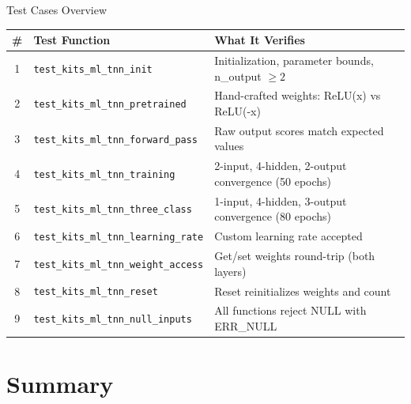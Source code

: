 \documentclass[aspectratio=169, 10pt]{beamer}
\begin{document}
\begin{frame}{Test Cases Overview}
\begin{table}
\centering
\small
\begin{tabular}{@{}clp{7cm}@{}}
\toprule
\textbf{\#} & \textbf{Test Function} & \textbf{What It Verifies} \\
\midrule
1 & \texttt{test\_kits\_ml\_tnn\_init}
  & Initialization, parameter bounds, n\_output $\geq 2$ \\
2 & \texttt{test\_kits\_ml\_tnn\_pretrained}
  & Hand-crafted weights: ReLU(x) vs ReLU(-x) \\
3 & \texttt{test\_kits\_ml\_tnn\_forward\_pass}
  & Raw output scores match expected values \\
4 & \texttt{test\_kits\_ml\_tnn\_training}
  & 2-input, 4-hidden, 2-output convergence (50 epochs) \\
5 & \texttt{test\_kits\_ml\_tnn\_three\_class}
  & 1-input, 4-hidden, 3-output convergence (80 epochs) \\
6 & \texttt{test\_kits\_ml\_tnn\_learning\_rate}
  & Custom learning rate accepted \\
7 & \texttt{test\_kits\_ml\_tnn\_weight\_access}
  & Get/set weights round-trip (both layers) \\
8 & \texttt{test\_kits\_ml\_tnn\_reset}
  & Reset reinitializes weights and count \\
9 & \texttt{test\_kits\_ml\_tnn\_null\_inputs}
  & All functions reject NULL with ERR\_NULL \\
\bottomrule
\end{tabular}
\end{table}
\end{frame}

\section{Summary}
\end{document}
